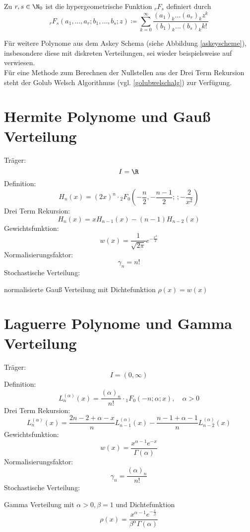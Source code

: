 \begin{mathdef}
Zu $r,s\in\N_0$ ist die hypergeometrische Funktion $_rF_s$ definiert durch
\[_rF_s(a_1,\dots,a_r;b_1,\dots,b_s;z)\coloneqq \sum_{k=0}^\infty \frac{(a_1)_k\dots (a_r)_kz^k}{(b_1)_k\dots(b_s)_kk!}\]
\end{mathdef}
Für weitere Polynome aus dem Askey Schema (siehe Abbildung \ref{askeyscheme}), insbesondere diese mit diskreten Verteilungen, sei wieder beispielsweise auf \autocite{dongbinxiu2010} verwiesen. \\
Für eine Methode zum Berechnen der Nullstellen aus der Drei Term Rekursion steht der Golub Welsch Algorithmus (vgl. \ref{golubwelschalg}) zur Verfügung.
\section{Hermite Polynome und Gauß Verteilung}
Träger:
\[I=\R\]
Definition:
\[H_n(x)=(2x)^n\cdot {_2F_0}\left(-\frac{n}{2},-\frac{n-1}{2};\, ;-\frac{2}{x^2}\right)\]
Drei Term Rekursion:
\[H_{n}(x)=xH_{n-1}(x)-(n-1)H_{n-2}(x)\]
Gewichtsfunktion:
\[w(x)=\frac{1}{\sqrt{2\pi}}e^{-\frac{x^2}{2}}\]
Normalisierungsfaktor:
\[\gamma_n=n!\]
Stochastische Verteilung:
\begin{center}
normalisierte Gauß Verteilung mit Dichtefunktion $\rho(x)=w(x)$
\end{center}

\section{Laguerre Polynome und Gamma Verteilung}
Träger:
\[I=(0,\infty)\]
Definition:
\[L_n^{(\alpha)}(x)=\frac{(\alpha)_n}{n!}\cdot {_1F_0}\left(-n;\alpha;x\right),\quad \alpha>0\]
Drei Term Rekursion:
\[L_{n}^{(\alpha)}(x)=\frac{2n-2+\alpha -x}{n}L_{n-1}^{(\alpha)}(x)-\frac{n-1+\alpha - 1}{n}L_{n-2}^{(\alpha)}(x)\]
Gewichtsfunktion:
\[w(x)=\frac{x^{\alpha-1}e^{-x}}{\Gamma(\alpha)}\]
Normalisierungsfaktor:
\[\gamma_n=\frac{(\alpha)_n}{n!}\]
Stochastische Verteilung:
\begin{center}
Gamma Verteilung mit $\alpha>0,\beta=1$ und Dichtefunktion
\[\rho(x)=\frac{x^{\alpha-1}e^{-\frac{x}{\beta}}}{\beta^{\alpha}\Gamma(\alpha)}\]
\end{center}

